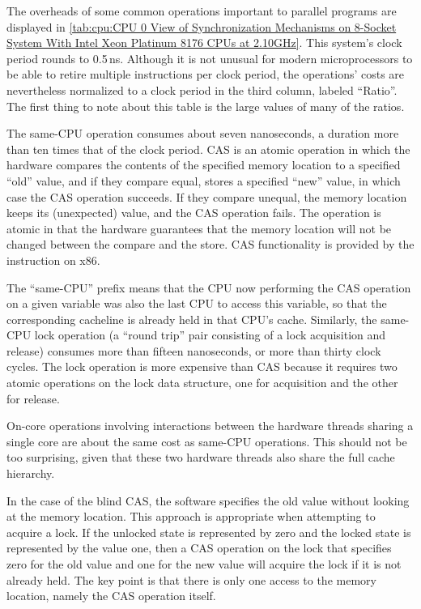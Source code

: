 The overheads of some common operations important to parallel programs are
displayed in
\cref{tab:cpu:CPU 0 View of Synchronization Mechanisms on 8-Socket System With Intel Xeon Platinum 8176 CPUs at 2.10GHz}.
This system's clock period rounds to 0.5\,ns.
Although it is not unusual for modern microprocessors to be able to
retire multiple instructions per clock period, the operations' costs are
nevertheless normalized to a clock period in the third column, labeled
``Ratio''.
The first thing to note about this table is the large values of many of
the ratios.

The same-CPU  operation consumes about seven
nanoseconds, a duration more than ten times that of the clock period.
CAS is an atomic operation in which the hardware compares the contents
of the specified memory location to a specified ``old'' value, and if
they compare equal, stores a specified ``new'' value, in which case the
CAS operation succeeds.
If they compare unequal, the memory location keeps its (unexpected) value,
and the CAS operation fails.
The operation is atomic in that the hardware guarantees that the memory
location will not be changed between the compare and the store.
CAS functionality is provided by the  instruction on x86.

The ``same-CPU'' prefix means that the CPU now performing the CAS operation
on a given variable was also the last CPU to access this variable, so
that the corresponding cacheline is already held in that CPU's cache.
Similarly, the same-CPU lock operation (a ``round trip'' pair consisting
of a lock acquisition and release) consumes more than fifteen nanoseconds,
or more than thirty clock cycles.
The lock operation is more expensive than CAS because it requires two
atomic operations on the lock data structure, one for acquisition and
the other for release.

On-core operations involving interactions between the hardware threads
sharing a single core are about the same cost as same-CPU operations.
This should not be too surprising, given that these two hardware threads
also share the full cache hierarchy.

In the case of the blind CAS, the software specifies the old value
without looking at the memory location.
This approach is appropriate when attempting to acquire a lock.
If the unlocked state is represented by zero and the locked state
is represented by the value one, then a CAS operation on the lock
that specifies zero for the old value and one for the new value
will acquire the lock if it is not already held.
The key point is that there is only one access to the memory
location, namely the CAS operation itself.

